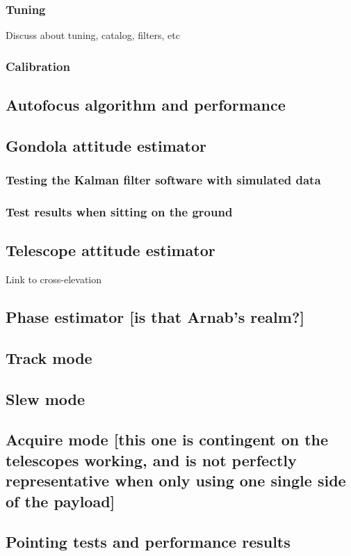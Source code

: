 \subsubsection{Tuning}
Discuss about tuning, catalog, filters, etc
\subsubsection{Calibration}
\subsection{Autofocus algorithm and performance}
\subsection{	Gondola attitude estimator}
\subsubsection{Testing the Kalman filter software with simulated data}
\subsubsection{Test results when sitting on the ground}
\subsection{Telescope attitude estimator}
Link to cross-elevation
\subsection{Phase estimator [is that Arnab’s realm?]}
\subsection{Track mode}
\subsection{	Slew mode}
\subsection{	Acquire mode [this one is contingent on the telescopes working, and is not perfectly representative when only using one single side of the payload]}
\subsection{	Pointing tests and performance results}

